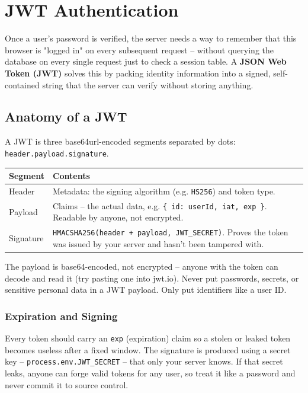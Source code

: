 \chapter{JWT Authentication}

Once a user's password is verified, the server needs a way to remember that
this browser is "logged in" on every subsequent request -- without querying
the database on every single request just to check a session table. A
\textbf{JSON Web Token (JWT)} solves this by packing identity information
into a signed, self-contained string that the server can verify without
storing anything.

\section{Anatomy of a JWT}

A JWT is three base64url-encoded segments separated by dots:
\texttt{header.payload.signature}.

\begin{center}
\begin{tabularx}{\textwidth}{lX}
\toprule
\textbf{Segment} & \textbf{Contents} \\
\midrule
Header & Metadata: the signing algorithm (e.g. \texttt{HS256}) and token type. \\
Payload & Claims -- the actual data, e.g. \texttt{\{ id: userId, iat, exp \}}. Readable by anyone, not encrypted. \\
Signature & \texttt{HMACSHA256(header + payload, JWT\_SECRET)}. Proves the token was issued by your server and hasn't been tampered with. \\
\bottomrule
\end{tabularx}
\end{center}

\begin{warnbox}[WARNING]
The payload is base64-encoded, not encrypted -- anyone with the token can
decode and read it (try pasting one into jwt.io). Never put passwords,
secrets, or sensitive personal data in a JWT payload. Only put identifiers
like a user ID.
\end{warnbox}

\subsection{Expiration and Signing}

Every token should carry an \texttt{exp} (expiration) claim so a stolen or
leaked token becomes useless after a fixed window. The signature is produced
using a secret key -- \texttt{process.env.JWT\_SECRET} -- that only your
server knows. If that secret leaks, anyone can forge valid tokens for any
user, so treat it like a password and never commit it to source control.

